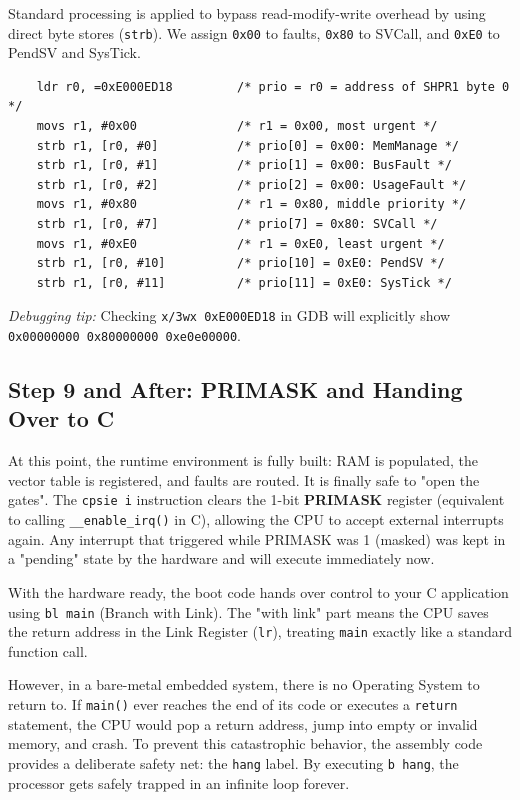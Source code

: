 Standard processing is applied to bypass read-modify-write overhead by using direct byte stores (\texttt{strb}). We assign \texttt{0x00} to faults, \texttt{0x80} to SVCall, and \texttt{0xE0} to PendSV and SysTick.

\begin{lstlisting}
    ldr r0, =0xE000ED18         /* prio = r0 = address of SHPR1 byte 0 */
    movs r1, #0x00              /* r1 = 0x00, most urgent */
    strb r1, [r0, #0]           /* prio[0] = 0x00: MemManage */
    strb r1, [r0, #1]           /* prio[1] = 0x00: BusFault */
    strb r1, [r0, #2]           /* prio[2] = 0x00: UsageFault */
    movs r1, #0x80              /* r1 = 0x80, middle priority */
    strb r1, [r0, #7]           /* prio[7] = 0x80: SVCall */
    movs r1, #0xE0              /* r1 = 0xE0, least urgent */
    strb r1, [r0, #10]          /* prio[10] = 0xE0: PendSV */
    strb r1, [r0, #11]          /* prio[11] = 0xE0: SysTick */
\end{lstlisting}

\textit{Debugging tip:} Checking \texttt{x/3wx 0xE000ED18} in GDB will explicitly show \texttt{0x00000000 0x80000000 0xe0e00000}.


\subsection{Step 9 and After: PRIMASK and Handing Over to C}
At this point, the runtime environment is fully built: RAM is populated, the vector table is registered, and faults are routed. It is finally safe to "open the gates". The \texttt{cpsie i} instruction clears the 1-bit \textbf{PRIMASK} register (equivalent to calling \texttt{\_\_enable\_irq()} in C), allowing the CPU to accept external interrupts again. Any interrupt that triggered while PRIMASK was 1 (masked) was kept in a "pending" state by the hardware and will execute immediately now.

With the hardware ready, the boot code hands over control to your C application using \texttt{bl main} (Branch with Link). The "with link" part means the CPU saves the return address in the Link Register (\texttt{lr}), treating \texttt{main} exactly like a standard function call.

However, in a bare-metal embedded system, there is no Operating System to return to. If \texttt{main()} ever reaches the end of its code or executes a \texttt{return} statement, the CPU would pop a return address, jump into empty or invalid memory, and crash. To prevent this catastrophic behavior, the assembly code provides a deliberate safety net: the \texttt{hang} label. By executing \texttt{b hang}, the processor gets safely trapped in an infinite loop forever.

